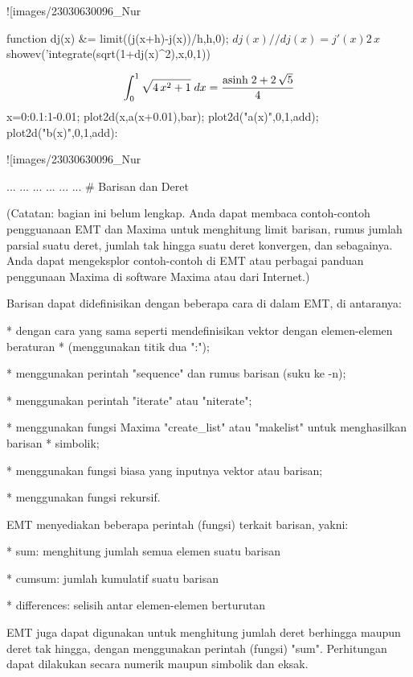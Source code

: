 \documentclass{article}
\begin{document}
![images/23030630096_Nur%

\>function dj(x) &= limit((j(x+h)-j(x))/h,h,0); $dj(x) // dj(x) = j'(x)


$$2\,x$$\>$showev('integrate(sqrt(1+dj(x)^2),x,0,1))


$$\int_{0}^{1}{\sqrt{4\,x^2+1}\;dx}=\frac{{\rm asinh}\; 2+2\,\sqrt{5}
 }{4}$$\>x=0:0.1:1-0.01; plot2d(x,a(x+0.01),\>bar); plot2d("a(x)",0,1,\>add); plot2d("b(x)",0,1,\>add):


![images/23030630096_Nur%

\> ...  
\>    ...  
\>    ...  
\>    ...  
\>    ...  
\>    ...  
\>  
# Barisan dan Deret

(Catatan: bagian ini belum lengkap. Anda dapat membaca contoh-contoh pengguanaan EMT dan
Maxima untuk menghitung limit barisan, rumus jumlah parsial suatu deret, jumlah tak hingga
suatu deret konvergen, dan sebagainya. Anda dapat mengeksplor contoh-contoh di EMT atau
perbagai panduan penggunaan Maxima di software Maxima atau dari Internet.)


Barisan dapat didefinisikan dengan beberapa cara di dalam EMT, di antaranya:


* 
dengan cara yang sama seperti mendefinisikan vektor dengan elemen-elemen beraturan
* (menggunakan titik dua ":");

* 
menggunakan perintah "sequence" dan rumus barisan (suku ke -n);

* 
menggunakan perintah "iterate" atau "niterate";

* 
menggunakan fungsi Maxima "create_list" atau "makelist" untuk menghasilkan barisan
* simbolik;

* 
menggunakan fungsi biasa yang inputnya vektor atau barisan;

* 
menggunakan fungsi rekursif.


EMT menyediakan beberapa perintah (fungsi) terkait barisan, yakni:


* 
sum: menghitung jumlah semua elemen suatu barisan

* 
cumsum: jumlah kumulatif suatu barisan

* 
differences: selisih antar elemen-elemen berturutan


EMT juga dapat digunakan untuk menghitung jumlah deret berhingga maupun deret tak hingga,
dengan menggunakan perintah (fungsi) "sum". Perhitungan dapat dilakukan secara numerik
maupun simbolik dan eksak.
\end{document}
